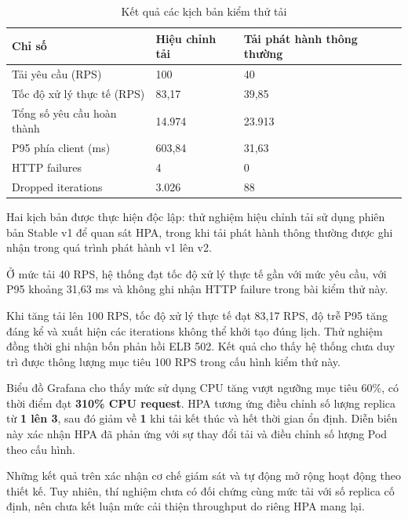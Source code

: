 \begin{table}[!htbp]\centering
\fontsize{12}{15}\selectfont{}
\setlength{\tabcolsep}{4pt}\setlength{\arrayrulewidth}{0.4pt}\renewcommand{\arraystretch}{1.2}
\setlength{\ReportTableWidth}{\dimexpr\linewidth-4\arrayrulewidth\relax}
\begin{tabular}{|L{\tabcolsep\relax}|L{\tabcolsep\relax}|L{\tabcolsep\relax}|}
\hline
\textbf{Chỉ số} & \textbf{Hiệu chỉnh tải} & \textbf{Tải phát hành thông thường} \\
\hline
Tải yêu cầu (RPS) & 100 & 40 \\\hline
Tốc độ xử lý thực tế (RPS) & 83,17 & 39,85 \\\hline
Tổng số yêu cầu hoàn thành & 14.974 & 23.913 \\\hline
P95 phía client (ms) & 603,84 & 31,63 \\\hline
HTTP failures & 4 & 0 \\\hline
Dropped iterations & 3.026 & 88 \\\hline
\end{tabular}
\caption{Kết quả các kịch bản kiểm thử tải}\label{tab:15}
\end{table}

Hai kịch bản được thực hiện độc lập: thử nghiệm hiệu chỉnh tải sử dụng phiên bản Stable v1 để quan sát HPA, trong khi tải phát hành thông thường được ghi nhận trong quá trình phát hành v1 lên v2.


Ở mức tải 40 RPS, hệ thống đạt tốc độ xử lý thực tế gần với mức yêu cầu, với P95 khoảng 31,63 ms và không ghi nhận HTTP failure trong bài kiểm thử này.


Khi tăng tải lên 100 RPS, tốc độ xử lý thực tế đạt 83,17 RPS, độ trễ P95 tăng đáng kể và xuất hiện các iterations không thể khởi tạo đúng lịch. Thử nghiệm đồng thời ghi nhận bốn phản hồi ELB 502. Kết quả cho thấy hệ thống chưa duy trì được thông lượng mục tiêu 100 RPS trong cấu hình kiểm thử này.


Biểu đồ Grafana cho thấy mức sử dụng CPU tăng vượt ngưỡng mục tiêu 60\%, có thời điểm đạt \textbf{310\% CPU request}. HPA tương ứng điều chỉnh số lượng replica từ \textbf{1 lên 3}, sau đó giảm về \textbf{1} khi tải kết thúc và hết thời gian ổn định. Diễn biến này xác nhận HPA đã phản ứng với sự thay đổi tải và điều chỉnh số lượng Pod theo cấu hình.


Những kết quả trên xác nhận cơ chế giám sát và tự động mở rộng hoạt động theo thiết kế. Tuy nhiên, thí nghiệm chưa có đối chứng cùng mức tải với số replica cố định, nên chưa kết luận mức cải thiện throughput do riêng HPA mang lại.


